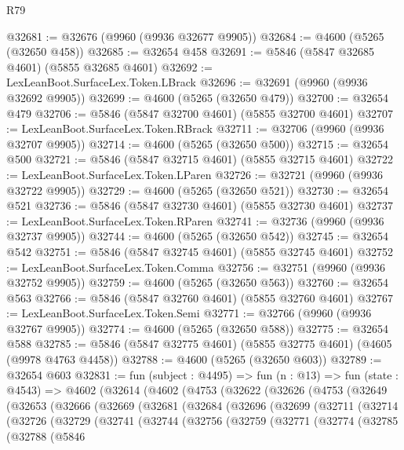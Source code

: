 \begin{lexlean}{R79}
\begin{coremodule}
@32681 := @32676 (@9960 (@9936 @32677 @9905))
@32684 := @4600 (@5265 (@32650 @458))
@32685 := @32654 @458
@32691 := @5846 (@5847 @32685 @4601) (@5855 @32685 @4601)
@32692 := LexLeanBoot.SurfaceLex.Token.LBrack
@32696 := @32691 (@9960 (@9936 @32692 @9905))
@32699 := @4600 (@5265 (@32650 @479))
@32700 := @32654 @479
@32706 := @5846 (@5847 @32700 @4601) (@5855 @32700 @4601)
@32707 := LexLeanBoot.SurfaceLex.Token.RBrack
@32711 := @32706 (@9960 (@9936 @32707 @9905))
@32714 := @4600 (@5265 (@32650 @500))
@32715 := @32654 @500
@32721 := @5846 (@5847 @32715 @4601) (@5855 @32715 @4601)
@32722 := LexLeanBoot.SurfaceLex.Token.LParen
@32726 := @32721 (@9960 (@9936 @32722 @9905))
@32729 := @4600 (@5265 (@32650 @521))
@32730 := @32654 @521
@32736 := @5846 (@5847 @32730 @4601) (@5855 @32730 @4601)
@32737 := LexLeanBoot.SurfaceLex.Token.RParen
@32741 := @32736 (@9960 (@9936 @32737 @9905))
@32744 := @4600 (@5265 (@32650 @542))
@32745 := @32654 @542
@32751 := @5846 (@5847 @32745 @4601) (@5855 @32745 @4601)
@32752 := LexLeanBoot.SurfaceLex.Token.Comma
@32756 := @32751 (@9960 (@9936 @32752 @9905))
@32759 := @4600 (@5265 (@32650 @563))
@32760 := @32654 @563
@32766 := @5846 (@5847 @32760 @4601) (@5855 @32760 @4601)
@32767 := LexLeanBoot.SurfaceLex.Token.Semi
@32771 := @32766 (@9960 (@9936 @32767 @9905))
@32774 := @4600 (@5265 (@32650 @588))
@32775 := @32654 @588
@32785 := @5846 (@5847 @32775 @4601) (@5855 @32775 @4601) (@4605 (@9978 @4763 @4458))
@32788 := @4600 (@5265 (@32650 @603))
@32789 := @32654 @603
@32831 := fun (subject : @4495) =>
  fun (n : @13) =>
  fun (state : @4543) =>
  @4602
    (@32614
      (@4602
        (@4753
          (@32622
            (@32626
              (@4753
                (@32649
                  (@32653
                    (@32666
                      (@32669
                        (@32681
                          (@32684
                            (@32696
                              (@32699
                                (@32711
                                  (@32714
                                    (@32726
                                      (@32729
                                        (@32741
                                          (@32744
                                            (@32756
                                              (@32759
                                                (@32771
                                                  (@32774
                                                    (@32785
                                                      (@32788
                                                        (@5846

\end{coremodule}
\end{lexlean}
